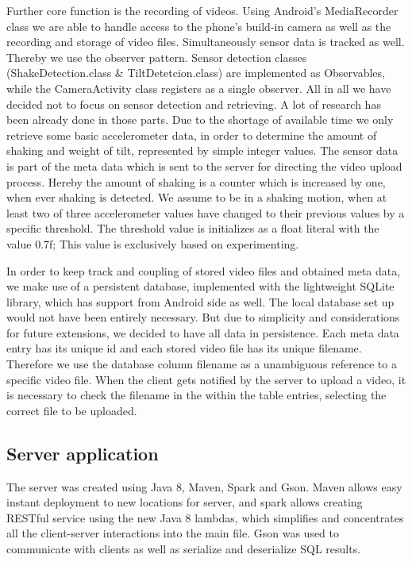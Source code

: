 \documentclass[conference]{IEEEtran}
\begin{document}
Further core function is the recording of videos. Using Android's MediaRecorder class we are able to handle access to the phone's build-in camera as well as the recording and storage of video files.
Simultaneously sensor data is tracked as well. Thereby we use the observer pattern. Sensor detection classes (ShakeDetection.class \& TiltDetetcion.class) are implemented as Observables, while the CameraActivity class registers as a single observer. All in all we have decided not to focus on sensor detection and retrieving. A lot of research has been already done in those parts. Due to the shortage of available time we only retrieve some basic accelerometer data, in order to determine the amount of shaking and weight of tilt, represented by simple integer values. The sensor data is part of the meta data which is sent to the server for directing the video upload process. Hereby the amount of shaking is a counter which is increased by one, when ever shaking is detected. We assume to be in a shaking motion, when at least two of three accelerometer values have changed to their previous values by a specific threshold. The threshold value is initializes as a float literal with the value 0.7f; This value is exclusively based on experimenting.


In order to keep track and coupling of stored video files and obtained meta data, we make use of a persistent database, implemented with the lightweight SQLite library, which has support from Android side as well. The local database set up would not have been entirely necessary. But due to simplicity and considerations for future extensions, we decided to have all data in persistence.
Each meta data entry has its unique id and each stored video file has its unique filename. Therefore we use the database column filename as a unambiguous reference to a specific video file. When the client gets notified by the server to upload a video, it is necessary to check the filename in the within the table entries, selecting the correct file to be uploaded.



\subsection{Server application}

The server was created using Java 8, Maven, Spark and Gson. Maven allows easy instant deployment to new locations for server,
and spark allows creating RESTful service using the new Java 8 lambdas, which simplifies and concentrates all the client-server
interactions into the main file. Gson was used to communicate with clients as well as serialize and deserialize SQL results.
\end{document}
